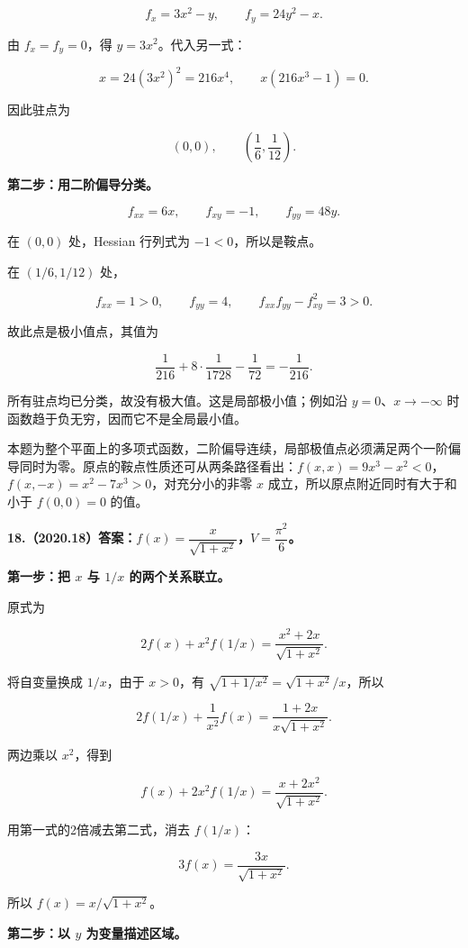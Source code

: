 \documentclass[UTF8,11pt,fontset=windows]{ctexart}
\begin{document}
$$
f_x=3x^2-y,\qquad f_y=24y^2-x.
$$

由 $f_x=f_y=0$，得 $y=3x^2$。代入另一式：

$$
x=24(3x^2)^2=216x^4,
\qquad x(216x^3-1)=0.
$$

因此驻点为

$$
(0,0),\qquad\left(\frac16,\frac1{12}\right).
$$

\textbf{第二步：用二阶偏导分类。}

$$
f_{xx}=6x,\qquad f_{xy}=-1,\qquad f_{yy}=48y.
$$

在 $(0,0)$ 处，Hessian 行列式为 $-1<0$，所以是鞍点。

在 $(1/6,1/12)$ 处，

$$
f_{xx}=1>0,\qquad f_{yy}=4,\qquad
f_{xx}f_{yy}-f_{xy}^2=3>0.
$$

故此点是极小值点，其值为

$$
\frac1{216}+8\cdot\frac1{1728}-\frac1{72}
=-\frac1{216}.
$$

所有驻点均已分类，故没有极大值。这是局部极小值；例如沿 $y=0$、$x\to-\infty$ 时函数趋于负无穷，因而它不是全局最小值。

本题为整个平面上的多项式函数，二阶偏导连续，局部极值点必须满足两个一阶偏导同时为零。原点的鞍点性质还可从两条路径看出：$f(x,x)=9x^3-x^2<0$，$f(x,-x)=x^2-7x^3>0$，对充分小的非零 $x$ 成立，所以原点附近同时有大于和小于 $f(0,0)=0$ 的值。

\clearpage

\textbf{18.（2020.18）答案：$f(x)=\dfrac{x}{\sqrt{1+x^2}}$，$V=\dfrac{\pi^2}{6}$。}

\textbf{第一步：把 $x$ 与 $1/x$ 的两个关系联立。}

原式为

$$
2f(x)+x^2f(1/x)=\frac{x^2+2x}{\sqrt{1+x^2}}.
$$

将自变量换成 $1/x$，由于 $x>0$，有 $\sqrt{1+1/x^2}=\sqrt{1+x^2}/x$，所以

$$
2f(1/x)+\frac1{x^2}f(x)=\frac{1+2x}{x\sqrt{1+x^2}}.
$$

两边乘以 $x^2$，得到

$$
f(x)+2x^2f(1/x)=\frac{x+2x^2}{\sqrt{1+x^2}}.
$$

用第一式的2倍减去第二式，消去 $f(1/x)$：

$$
3f(x)=\frac{3x}{\sqrt{1+x^2}}.
$$

所以 $f(x)=x/\sqrt{1+x^2}$。

\textbf{第二步：以 $y$ 为变量描述区域。}
\end{document}

